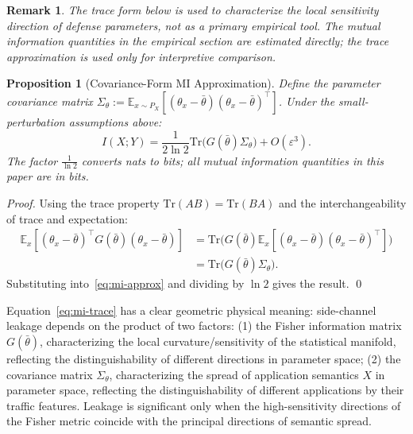\documentclass[10pt,a4paper]{amsart}
\newtheorem{proposition}{Proposition}
\newtheorem{remark}{Remark}
\newcommand{\E}{\mathbb{E}}
\begin{document}
\begin{remark}
The trace form below is used to characterize the local sensitivity
direction of defense parameters, not as a primary empirical tool.
The mutual information quantities in the empirical section are estimated
directly; the trace approximation is used only for interpretive comparison.
\end{remark}

\begin{proposition}[Covariance-Form MI Approximation]\label{prop:mi-cov}
Define the parameter covariance matrix
$\Sigma_\theta := \E_{x\sim P_X}[(\theta_x-\bar\theta)(\theta_x-\bar\theta)^\top]$.
Under the small-perturbation assumptions above:
\begin{equation}\label{eq:mi-trace}
I(X;Y) = \frac{1}{2\ln 2}\mathrm{Tr}\!\big(G(\bar\theta)\Sigma_\theta\big) + O(\varepsilon^3).
\end{equation}
The factor $\frac{1}{\ln 2}$ converts nats to bits; all mutual
information quantities in this paper are in bits.
\end{proposition}

\begin{proof}
Using the trace property $\mathrm{Tr}(AB) = \mathrm{Tr}(BA)$ and the
interchangeability of trace and expectation:
\begin{align*}
\E_x\!\left[(\theta_x-\bar\theta)^\top G(\bar\theta)(\theta_x-\bar\theta)\right]
  &= \mathrm{Tr}\!\big(G(\bar\theta)\E_x[(\theta_x-\bar\theta)(\theta_x-\bar\theta)^\top]\big)\\
  &= \mathrm{Tr}\!\big(G(\bar\theta)\Sigma_\theta\big).
\end{align*}
Substituting into~\eqref{eq:mi-approx} and dividing by $\ln 2$ gives the
result. \qed
\end{proof}

Equation~\eqref{eq:mi-trace} has a clear geometric physical meaning:
side-channel leakage depends on the product of two factors:
(1) the Fisher information matrix $G(\bar\theta)$, characterizing the local
curvature/sensitivity of the statistical manifold, reflecting the
distinguishability of different directions in parameter space;
(2) the covariance matrix $\Sigma_\theta$, characterizing the spread of
application semantics $X$ in parameter space, reflecting the distinguishability
of different applications by their traffic features.
Leakage is significant only when the high-sensitivity directions of the
Fisher metric coincide with the principal directions of semantic spread.
\end{document}

